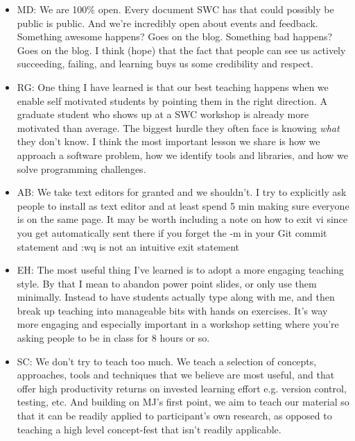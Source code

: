 \documentclass{article}
\begin{document}
\begin{itemize}
  \item MD: We are 100\% open. Every document SWC has that could
    possibly be public is public. And we're incredibly open about
    events and feedback. Something awesome happens? Goes on the
    blog. Something bad happens? Goes on the blog. I think (hope) that
    the fact that people can see us actively succeeding, failing, and
    learning buys us some credibility and respect.

  \item RG: One thing I have learned is that our best teaching happens
    when we enable self motivated students by pointing them in the
    right direction. A graduate student who shows up at a SWC workshop
    is already more motivated than average. The biggest hurdle they
    often face is knowing \emph{what} they don't know. I think the
    most important lesson we share is how we approach a software
    problem, how we identify tools and libraries, and how we solve
    programming challenges.

  \item AB: We take text editors for granted and we shouldn't. I try
    to explicitly ask people to install as text editor and at least
    spend 5 min making sure everyone is on the same page. It may be
    worth including a note on how to exit vi since you get
    automatically sent there if you forget the -m in your Git commit
    statement and :wq is not an intuitive exit statement

  \item EH: The most useful thing I've learned is to adopt a more
    engaging teaching style.  By that I mean to abandon power point
    slides, or only use them minimally.  Instead to have students
    actually type along with me, and then break up teaching into
    manageable bits with hands on exercises.  It's way more engaging
    and especially important in a workshop setting where you're asking
    people to be in class for 8 hours or so.

  \item SC: We don't try to teach too much. We teach a selection of
    concepts, approaches, tools and techniques that we believe are
    most useful, and that offer high productivity returns on invested
    learning effort e.g. version control, testing, etc.  And building
    on MJ's first point, we aim to teach our material so that it can
    be readily applied to participant's own research, as opposed to
    teaching a high level concept-fest that isn't readily applicable.


\end{itemize}
\end{document}
